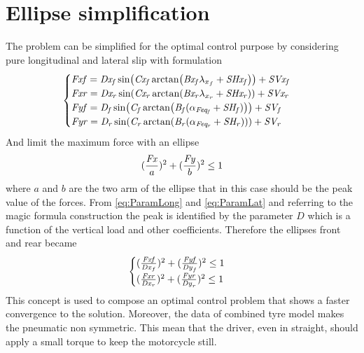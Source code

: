\section{Ellipse simplification}
%
The problem can be simplified for the optimal control purpose by considering pure longitudinal and lateral slip with formulation
%
\begin{equation}
    \begin{cases}
    {\it Fxf} = {\it Dx_f}\sin({\it Cx_f}\arctan({\it Bx_f}\lambda_{x_f}+{\it SHx_f}))+{\it SVx_f}\\
    {\it Fxr} = {\it Dx_r}\sin({\it Cx_r}\arctan({\it Bx_r}\lambda_{x_r}+{\it SHx_r}))+{\it SVx_r}\\
    {\it Fyf} = {\it D_f}\sin({\it C_f}\arctan({\it B_f}(\alpha_{\it Feq_f}+{\it SH_f})))+{\it SV_f}\\
    {\it Fyr} = {\it D_r}\sin({\it C_r}\arctan({\it B_r}(\alpha_{\it Feq_r}+{\it SH_r})))+{\it SV_r}
    \end{cases}
\end{equation}
%
And limit the maximum force with an ellipse
%
\begin{equation}
    (\frac{{\it Fx}}{a})^2 + (\frac{{\it Fy}}{b})^2 \le 1
\end{equation}
%
where $a$ and $b$ are the two arm of the ellipse that in this case should be the peak value of the forces. From \ref{eq:ParamLong} and \ref{eq:ParamLat} and referring to the magic formula construction the peak is identified by the parameter $D$ which is a function of the vertical load and other coefficients. Therefore the ellipses front and rear became
%
\begin{equation}
    \begin{cases}
        (\frac{{\it Fxf}}{{\it Dx}_{f} })^2 + (\frac{{\it Fyf}}{{\it Dy}_{f} })^2 \le 1\\
        (\frac{{\it Fxr}}{{\it Dx}_{r} })^2 + (\frac{{\it Fyr}}{{\it Dy}_{r} })^2 \le 1
    \end{cases}
\end{equation}
%
This concept is used to compose an optimal control problem that shows a faster convergence to the solution. Moreover, the data of combined tyre model makes the pneumatic non symmetric. This mean that the driver, even in straight, should apply a small torque to keep the motorcycle still.
%